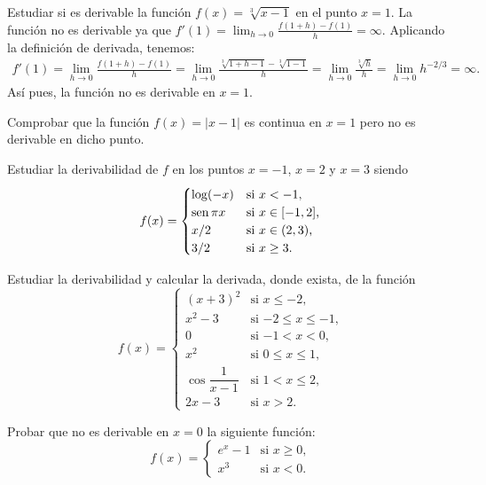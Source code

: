
{Estudiar si es derivable la función $f(x)=\sqrt[3]{x-1}$ en el punto $x=1$.
}
{La función no es derivable ya que $f'(1)=\lim_{h\rightarrow 0}\frac{f(1+h)-f(1)}{h} = \infty$.
}
{Aplicando la definición de derivada, tenemos:
\begin{align*}
f'(1) = \lim_{h\rightarrow 0}\frac{f(1+h)-f(1)}{h} = \lim_{h\rightarrow 0}\frac{\sqrt[3]{1+h-1}-\sqrt[3]{1-1}}{h} = \lim_{h\rightarrow 0}\frac{\sqrt[3]{h}}{h} = \lim_{h\rightarrow 0} h^{-2/3} = \infty.
\end{align*}
Así pues, la función no es derivable en $x=1$.
}


{Comprobar que la función $f(x)=|x-1|$ es continua en $x=1$ pero no es derivable en dicho punto.
}


{Estudiar la derivabilidad de $f$ en los puntos $x=-1$, $x=2$ y $x=3$ siendo
\[ f(x)=
\begin{cases}
\log(-x) & \mbox{si $x<-1$,} \\
\operatorname{sen} \pi x & \mbox{si $x\in [-1,2]$,} \\
x/2 & \mbox{si $x\in (2,3)$,} \\
3/2 & \mbox{si $x\geq 3$.}
\end{cases}
\]
}


{Estudiar la derivabilidad y calcular la derivada, donde exista, de la función
\[ f(x)=
\begin{cases}
(x+3)^2 & \mbox{si $x\leq -2$,} \\
x^2-3 & \mbox{si $-2\leq x\leq -1$,} \\
0 & \mbox{si $-1< x <0$,} \\
x^2 & \mbox{si $0\leq x \leq 1$,} \\
\cos \dfrac{1}{x-1} & \mbox{si $1< x\leq 2$,} \\
2x-3 & \mbox{si $x>2$.}
\end{cases}
\]
}


{Probar que no es derivable en $x=0$ la siguiente función:
\[ f(x)=
\begin{cases}
e^x-1 & \mbox{si $x\geq 0$,}  \\
x^3 & \mbox{si $x<0$.}
\end{cases}
\]
}


